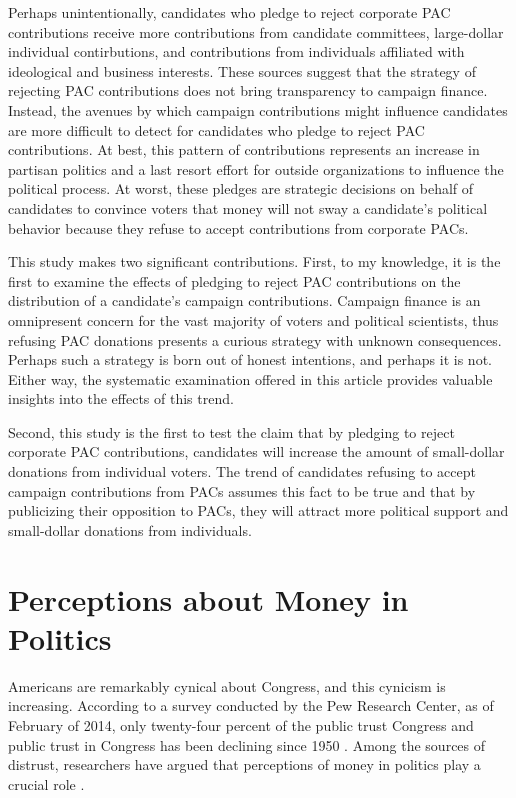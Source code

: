\documentclass[12pt]{article}
\begin{document}
Perhaps unintentionally, candidates who pledge to reject corporate PAC contributions receive more contributions from candidate committees, large-dollar individual contirbutions, and contributions from individuals affiliated with ideological and business interests. These sources suggest that the strategy of rejecting PAC contributions does not bring transparency to campaign finance. Instead, the avenues by which campaign contributions might influence candidates are more difficult to detect for candidates who pledge to reject PAC contributions. At best, this pattern of contributions represents an increase in partisan politics and a last resort effort for outside organizations to influence the political process. At worst, these pledges are strategic decisions on behalf of candidates to convince voters that money will not sway a candidate's political behavior because they refuse to accept contributions from corporate PACs.     

This study makes two significant contributions. First, to my knowledge, it is the first to examine the effects of pledging to reject PAC contributions on the distribution of a candidate's campaign contributions. Campaign finance is an omnipresent concern for the vast majority of voters and political scientists, thus refusing PAC donations presents a curious strategy with unknown consequences. Perhaps such a strategy is born out of honest intentions, and perhaps it is not. Either way, the systematic examination offered in this article provides valuable insights into the effects of this trend. 

Second, this study is the first to test the claim that by pledging to reject corporate PAC contributions, candidates will increase the amount of small-dollar donations from individual voters. The trend of candidates refusing to accept campaign contributions from PACs assumes this fact to be true and that by publicizing their opposition to PACs, they will attract more political support and small-dollar donations from individuals.  


\section{Perceptions about Money in Politics}

 Americans are remarkably cynical about Congress, and this cynicism is increasing. According to a survey conducted by the Pew Research Center, as of February of 2014, only twenty-four percent of the public trust Congress \citep{pewresearchcenter2014} and public trust in Congress has been declining since 1950 \citep{dalton2005}. Among the sources of distrust, researchers have argued that perceptions of money in politics play a crucial role \citep{lubenow2001}. 
 
\end{document}
